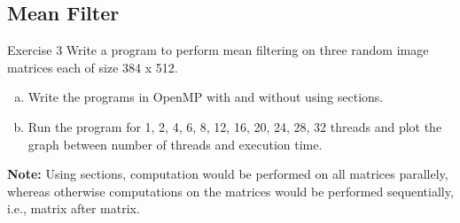 \documentclass{beamer}
\begin{document}
		\subsection{Mean Filter}
			\begin{frame}{Exercise 3}
				Write a program to perform mean filtering on three random image matrices each of size 384 x 512.
				\begin{enumerate}[(a)]
					\item Write the programs in OpenMP with and without using sections.
					\item Run the program for 1, 2, 4, 6, 8, 12, 16, 20, 24, 28, 32 threads and plot the graph between number of threads and execution time.
				\end{enumerate}
				
				\begin{block}{}
					\scriptsize \textbf{Note:} Using sections, computation would be performed on all matrices parallely, whereas otherwise computations on the matrices would be performed sequentially, i.e., matrix after matrix.
				\end{block}
			\end{frame}
			
\end{document}

